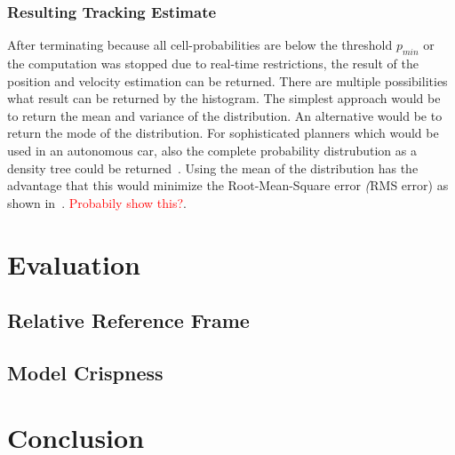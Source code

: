 \documentclass[twoside,a4paper,article]{combine}
\begin{document}
\subsubsection{Resulting Tracking Estimate}
\label{sub:adh-resulting}
After terminating because all cell-probabilities are below the
threshold $p_{min}$ or the computation was stopped due to real-time
restrictions, the result of the position and velocity estimation can
be returned. There are multiple possibilities what result can be
returned by the histogram. The simplest approach would be to return
the mean and variance of the distribution. An alternative would be to
return the mode of the distribution. For sophisticated planners which
would be used in an autonomous car, also the complete probability
distrubution as a density tree could be returned~\cite{density-tree}.
Using the mean of the distribution has the advantage that this would
minimize the Root-Mean-Square error \textit(RMS error) as shown
in~\cite{paper}. \textcolor{red}{Probabily show this?}.

\section{Evaluation}
\label{sec:evaluation}
\subsection{Relative Reference Frame}
\label{sub:relative-ref-frame}
\subsection{Model Crispness}
\label{sub:model-crispness}

\section{Conclusion}
\label{sec:conclusion}





\end{document}
